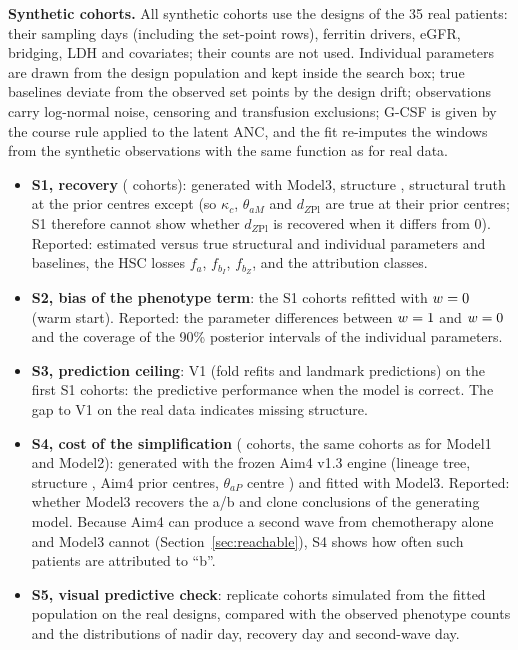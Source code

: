 \documentclass[11pt]{article}
\begin{document}
\textbf{Synthetic cohorts.} All synthetic cohorts use the designs of the 35 real patients: their sampling days (including the set-point rows), ferritin drivers, eGFR, bridging, LDH and covariates; their counts are not used. Individual parameters are drawn from the design population and kept inside the search box; true baselines deviate from the observed set points by the design drift; observations carry log-normal noise, censoring and transfusion exclusions; G-CSF is given by the course rule applied to the latent ANC, and the fit re-imputes the windows from the synthetic observations with the same function as for real data.
\begin{itemize}
\item \textbf{S1, recovery} (\valSone{} cohorts): generated with Model3, structure \texttt{\valSoneModel}, structural truth at the prior centres except \valSoneTruth{} (so $\kappa_c$, $\theta_{aM}$ and $d_{Z\mathrm{Pl}}$ are true at their prior centres; S1 therefore cannot show whether $d_{Z\mathrm{Pl}}$ is recovered when it differs from 0). Reported: estimated versus true structural and individual parameters and baselines, the HSC losses $f_a$, $f_{b_I}$, $f_{b_Z}$, and the attribution classes.
\item \textbf{S2, bias of the phenotype term}: the S1 cohorts refitted with $w=0$ (warm start). Reported: the parameter differences between $w=1$ and $w=0$ and the coverage of the 90\% posterior intervals of the individual parameters.
\item \textbf{S3, prediction ceiling}: V1 (fold refits and landmark predictions) on the first \valSthree{} S1 cohorts: the predictive performance when the model is correct. The gap to V1 on the real data indicates missing structure.
\item \textbf{S4, cost of the simplification} (\valSfour{} cohorts, the same cohorts as for Model1 and Model2): generated with the frozen Aim4 v1.3 engine (lineage tree, structure \texttt{\valSfourModel}, Aim4 prior centres, $\theta_{aP}$ centre \valThapAimFour) and fitted with Model3. Reported: whether Model3 recovers the a/b and clone conclusions of the generating model. Because Aim4 can produce a second wave from chemotherapy alone and Model3 cannot (Section~\ref{sec:reachable}), S4 shows how often such patients are attributed to ``b''.
\item \textbf{S5, visual predictive check}: \valSfive{} replicate cohorts simulated from the fitted population on the real designs, compared with the observed phenotype counts and the distributions of nadir day, recovery day and second-wave day.
\end{itemize}
\end{document}

